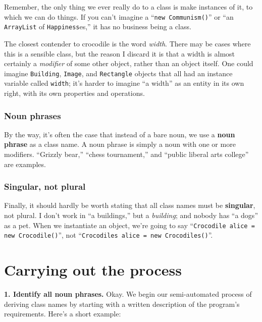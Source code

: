 Remember, the only thing we ever really do to a class is make instances of it,
to which we can do things. If you can't imagine a ``\texttt{new Communism()}''
or ``an \texttt{ArrayList} of \texttt{Happiness}es,'' it has no business being
a class.

The closest contender to crocodile is the word \textit{width}. There may be
cases where this is a sensible class, but the reason I discard it is that a
width is almost certainly a \textit{modifier} of some other object, rather
than an object itself. One could imagine \texttt{Building}, \texttt{Image},
and \texttt{Rectangle} objects that all had an instance variable called
\texttt{width}; it's harder to imagine ``a width'' as an entity in its own
right, with its own properties and operations.

\subsubsection{Noun phrases}

By the way, it's often the case that instead of a bare noun, we use a
\textbf{noun phrase} as a class name. A noun phrase is simply a noun with one
or more modifiers. ``Grizzly bear,'' ``chess tournament,'' and ``public liberal
arts college'' are examples.

\subsubsection{Singular, not plural}

Finally, it should hardly be worth stating that all class names must be
\textbf{singular}, not plural. I don't work in ``a buildings,'' but a
\textit{building}; and nobody has ``a dogs'' as a pet. When we instantiate an
object, we're going to say ``\texttt{Crocodile alice = new Crocodile()}'', not 
``\texttt{Crocodiles alice = new Crocodiles()}''.

\section{Carrying out the process}

\textbf{1. Identify all noun phrases.} Okay. We begin our semi-automated
process of deriving class names by starting with a written description of the
program's requirements. Here's a short example:

